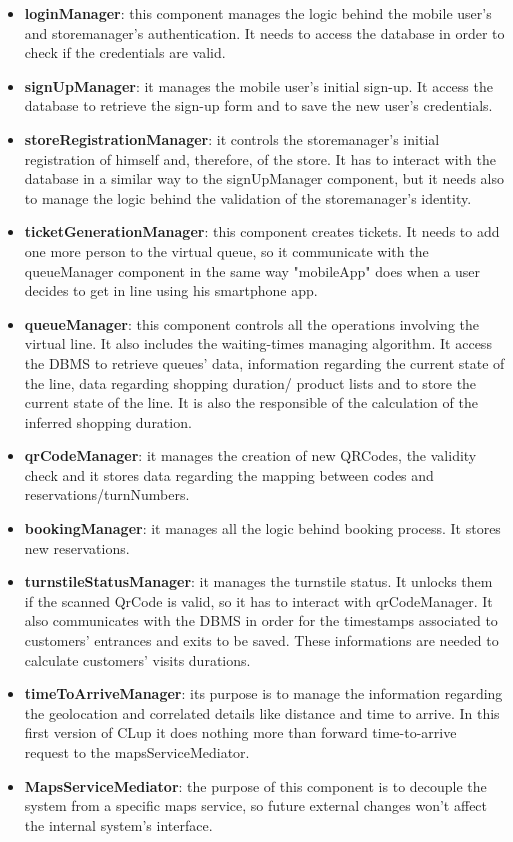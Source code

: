 \documentclass{article}
\begin{document}
\begin{itemize}
\item\textbf{loginManager}: this component manages the logic behind the mobile user's and storemanager's authentication.
It needs to access the database in order to check if the credentials are valid.
\item\textbf{signUpManager}: it manages the mobile user's initial sign-up. It access the database to retrieve the sign-up
form and to save the new user's credentials.
\item\textbf{storeRegistrationManager}: it controls the storemanager's initial registration of himself and, therefore,
of the store. It has to interact with the database in a similar way to the signUpManager component, but it 
needs also to manage the logic behind the validation of the storemanager's identity.
\item\textbf{ticketGenerationManager}: this component creates tickets. It needs to add one more person to the virtual
queue, so it communicate with the queueManager component in the same way "mobileApp" does when
a user decides to get in line using his smartphone app.
\item\textbf{queueManager}: this component controls all the operations involving the virtual line. It also includes
the waiting-times managing algorithm. It access the DBMS to retrieve queues' data, information regarding the current state of the line, data regarding shopping duration/ product lists and to store the current state of the line. It is also the responsible of the calculation of the inferred shopping duration.
\item\textbf{qrCodeManager}: it manages the creation of new QRCodes, the validity check and it stores data regarding
the mapping between codes and reservations/turnNumbers.
\item\textbf{bookingManager}: it manages all the logic behind booking process. It stores new reservations.
\item\textbf{turnstileStatusManager}: it manages the turnstile status. It unlocks them if the scanned QrCode is valid, so
it has to interact with qrCodeManager. It also communicates with the DBMS in order for the timestamps associated to customers' entrances and exits to be saved. These informations are needed to calculate customers' visits durations.
\item\textbf{timeToArriveManager}: its purpose is to manage the information regarding the geolocation and correlated details like distance and time to arrive. In this first version of CLup it does nothing more than forward time-to-arrive request to the mapsServiceMediator.
\item\textbf{MapsServiceMediator}: the purpose of this component is to decouple the system from a specific maps service, so future external changes won't affect the internal system's interface.

\end{itemize}
\end{document}
